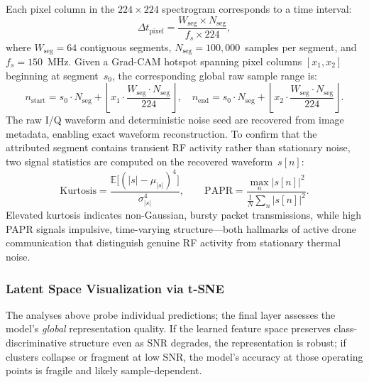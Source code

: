 \documentclass[runningheads]{llncs}
\begin{document}
Each pixel column in the $224 \times 224$ spectrogram corresponds to a time interval:
\begin{equation}
  \Delta t_{\text{pixel}} =
  \frac{W_{\text{seg}} \times N_{\text{seg}}}{f_s \times 224},
\end{equation}
where $W_{\text{seg}} = 64$ contiguous segments, $N_{\text{seg}} = 100{,}000$~samples per segment, and $f_s = 150$~MHz. Given a Grad-CAM hotspot spanning pixel columns $[x_1, x_2]$ beginning at segment~$s_0$, the corresponding global raw sample range is:
\begin{equation}
  n_{\text{start}} = s_0 \cdot N_{\text{seg}} +
  \left\lfloor x_1 \cdot
  \frac{W_{\text{seg}} \cdot N_{\text{seg}}}{224} \right\rfloor, \quad
  n_{\text{end}} = s_0 \cdot N_{\text{seg}} +
  \left\lfloor x_2 \cdot
  \frac{W_{\text{seg}} \cdot N_{\text{seg}}}{224} \right\rfloor.
\end{equation}
The raw I/Q waveform and deterministic noise seed are recovered from image metadata, enabling exact waveform reconstruction. To confirm that the attributed segment contains transient RF activity rather than stationary noise, two signal statistics are computed on the recovered waveform~$s[n]$:
\begin{equation}
  \text{Kurtosis} =
  \frac{\mathbb{E}\bigl[(|s| - \mu_{|s|})^4\bigr]}{\sigma_{|s|}^4},
  \qquad
  \text{PAPR} =
  \frac{\max_n |s[n]|^2}{\tfrac{1}{N}\sum_n |s[n]|^2}.
\end{equation}
Elevated kurtosis indicates non-Gaussian, bursty packet transmissions, while high PAPR signals impulsive, time-varying structure---both hallmarks of active drone communication that distinguish genuine RF activity from stationary thermal noise.

\subsubsection{Latent Space Visualization via t-SNE}

The analyses above probe individual predictions; the final layer assesses the model's \emph{global} representation quality. If the learned feature space preserves class-discriminative structure even as SNR degrades, the representation is robust; if clusters collapse or fragment at low SNR, the model's accuracy at those operating points is fragile and likely sample-dependent.
\end{document}
